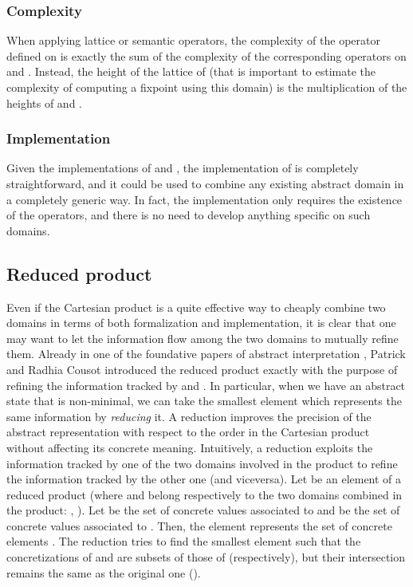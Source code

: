 \documentclass[submission,copyright,creativecommons]{eptcs}
\begin{document}
\subsubsection{Complexity}
When applying lattice or semantic operators, the complexity of the operator defined on  is exactly the sum of the complexity of the corresponding operators on  and . Instead, the height of the lattice of  (that is important to estimate the complexity of computing a fixpoint using this domain) is the multiplication of the heights of  and .

\subsubsection{Implementation}
Given the implementations of  and , the implementation of  is completely straightforward, and it could be used to combine any existing abstract domain in a completely generic way. In fact, the implementation only requires the existence of the operators, and there is no need to develop anything specific on such domains.

\subsection{Reduced product}
Even if the Cartesian product is a quite effective way to cheaply combine two domains in terms of both formalization and implementation, it is clear that one may want to let the information flow among the two domains to mutually refine them. Already in one of the foundative papers of abstract interpretation \cite{CC79}, Patrick and Radhia Cousot introduced the reduced product exactly with the purpose of refining the information tracked by  and . In particular, when we have an abstract state that is non-minimal, we can take the smallest element which represents the same information by \emph{reducing} it. A reduction improves the precision of the abstract representation
with respect to the order in the Cartesian product without affecting its concrete meaning. Intuitively, a reduction exploits the information tracked by one of the two domains involved in the product to refine the information tracked by the other one (and viceversa). Let  be an element of a reduced product (where  and  belong respectively to the two domains combined in the product: , ). Let  be the set of concrete values associated to  and  be the set of concrete values associated to . Then, the element  represents the set of concrete elements . The reduction tries to find the smallest element  such that the concretizations of  and  are subsets of those of  (respectively), but their intersection remains the same as the original one ().
\end{document}
